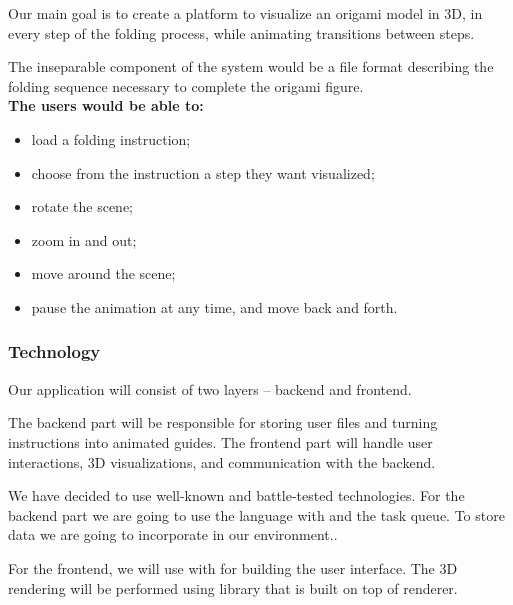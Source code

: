 Our main goal is to create a platform to visualize an origami model in 3D,
in every step of the folding process, while animating transitions between steps.

The inseparable component of the system would be a file format describing the folding sequence necessary to complete the origami figure.\\

\noindent \textbf{The users would be able to:}
\begin{itemize}
	\item load a folding instruction;
	\item choose from the instruction a step they want visualized;
	\item rotate the scene;
    \item zoom in and out;
	\item move around the scene;
	\item pause the animation at any time, and move back and forth.
\end{itemize}

\subsubsection{Technology}

Our application will consist of two layers -- backend and frontend.

The backend part will be responsible for storing user files and turning instructions into animated guides.
The frontend part will handle user interactions, 3D visualizations, and communication with the backend.

We have decided to use well-known and battle-tested technologies.
For the backend part we are going to use the  language with  and the  task queue. To store data we are going to incorporate  in our environment..

For the frontend, we will use  with  for building the user interface.
The 3D rendering will be performed using  library that is built on top of  renderer.

